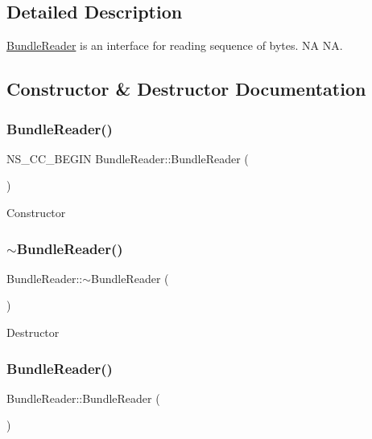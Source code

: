 \subsection{Detailed Description}
\hyperlink{classBundleReader}{Bundle\+Reader} is an interface for reading sequence of bytes.  NA  NA. 

\subsection{Constructor \& Destructor Documentation}
\mbox{\label{classBundleReader_a4d7011372508764b19811dc27874fa89}} 
\subsubsection{\texorpdfstring{Bundle\+Reader()}{BundleReader()}\hspace{0.1cm}{\footnotesize\ttfamily [1/2]}}
{\footnotesize\ttfamily N\+S\+\_\+\+C\+C\+\_\+\+B\+E\+G\+IN Bundle\+Reader\+::\+Bundle\+Reader (\begin{DoxyParamCaption}{ }\end{DoxyParamCaption})}

Constructor \mbox{\label{classBundleReader_a74fc64e8701659f72821a8b91373500a}} 
\subsubsection{\texorpdfstring{$\sim$\+Bundle\+Reader()}{~BundleReader()}\hspace{0.1cm}{\footnotesize\ttfamily [1/2]}}
{\footnotesize\ttfamily Bundle\+Reader\+::$\sim$\+Bundle\+Reader (\begin{DoxyParamCaption}{ }\end{DoxyParamCaption})}

Destructor \mbox{\label{classBundleReader_a3aea077c1877188a489dba8c4deb8423}} 
\subsubsection{\texorpdfstring{Bundle\+Reader()}{BundleReader()}\hspace{0.1cm}{\footnotesize\ttfamily [2/2]}}
{\footnotesize\ttfamily Bundle\+Reader\+::\+Bundle\+Reader (\begin{DoxyParamCaption}{ }\end{DoxyParamCaption})}

